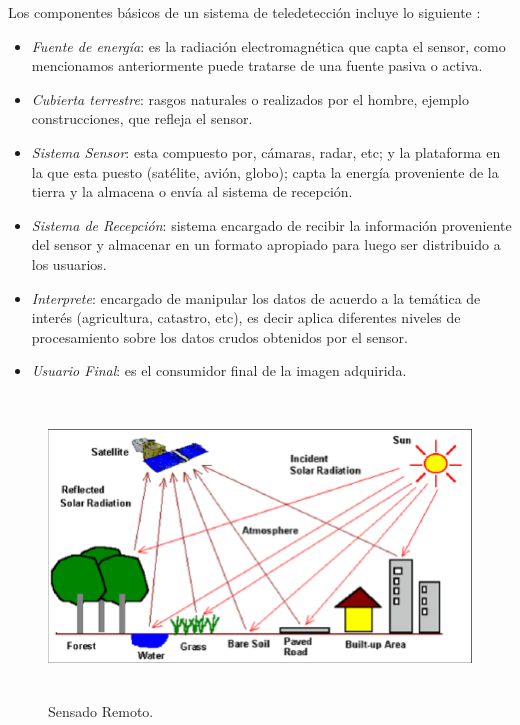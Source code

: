 Los componentes básicos de un sistema de teledetección incluye lo siguiente \citep{chuvieco}:
\begin{itemize}
\item \textit{Fuente de energía}: es la radiación electromagnética que capta el sensor, como mencionamos anteriormente puede tratarse de una fuente pasiva o activa.

\item \textit{Cubierta terrestre}: rasgos naturales o realizados por el hombre, ejemplo construcciones, que refleja el sensor.

\item \textit{Sistema Sensor}: esta compuesto por, cámaras, radar, etc; y la plataforma en la que esta puesto (satélite, avión, globo);  capta la energía proveniente de la tierra y la almacena o envía al sistema de recepción.

\item \textit{Sistema de Recepción}: sistema encargado de recibir la información proveniente del sensor y almacenar en un formato apropiado para luego ser distribuido a los usuarios.

\item \textit{Interprete}: encargado de manipular los datos de acuerdo a la temática de interés (agricultura, catastro, etc), es decir aplica diferentes niveles de procesamiento sobre los datos crudos obtenidos por el sensor.

\item \textit{Usuario Final}: es el consumidor final de la imagen adquirida.
\end{itemize}

\begin{figure}[H] \centering
  \includegraphics[height=8cm,keepaspectratio=true,clip=true]{imagenes/MarcoTeorico/teledeteccion.png}
  \caption{Sensado Remoto.}\label{Fig:teledeteccion}
\end{figure}

